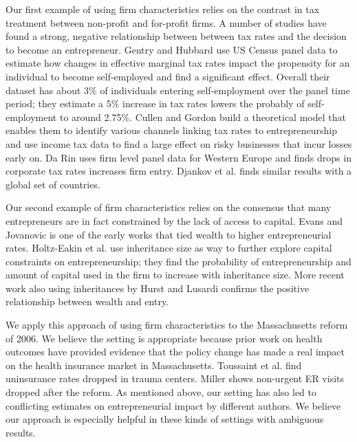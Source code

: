 \documentclass[12pt]{article}
\begin{document}
Our first example of using firm characteristics relies on the contrast in tax treatment between non-profit and for-profit firms. A number of studies have found a strong, negative relationship between between tax rates and the decision to become an entrepreneur. Gentry and Hubbard \citep{gentry2000tax} use US Census panel data to estimate how changes in effective marginal tax rates impact the propensity for an individual to become self-employed and find a significant effect. Overall their dataset has about 3\% of individuals entering self-employment over the panel time period; they estimate a 5\% increase in tax rates lowers the probably of self-employment to around 2.75\%. Cullen and Gordon \citep{cullen2007taxes} build a theoretical model that enables them to identify various channels linking tax rates to entrepreneurship and use income tax data to find a large effect on risky businesses that incur losses early on. Da Rin \citep{da2011entrepreneurship} uses firm level panel data for Western Europe and finds drops in corporate tax rates increases firm entry. Djankov et al. \citep{djankov2010effect} finds similar results with a global set of countries. 

Our second example of firm characteristics relies on the consensus that many entrepreneurs are in fact constrained by the lack of access to capital. Evans and Jovanovic \citep{evans1989estimated} is one of the early works that tied wealth to higher entrepreneurial rates. Holtz-Eakin et al. \citep{holtz1994entrepreneurial} use inheritance size as way to further explore capital constraints on entrepreneurship; they find the probability of entrepreneurship and amount of capital used in the firm to increase with inheritance size. More recent work also using inheritances by Hurst and Lusardi \citep{hurst2004liquidity} confirms the positive relationship between wealth and entry. 

We apply this approach of using firm characteristics to the Massachusetts reform of 2006. We believe the setting is appropriate because prior work on health outcomes have provided evidence that the policy change has made a real impact on the health insurance market in Massachusetts. Toussaint et al. \citep{toussaint2014effect} find uninsurance rates dropped in trauma centers. Miller \citep{miller2012effect} shows non-urgent ER visits dropped after the reform. As mentioned above, our setting has also led to conflicting estimates on entrepreneurial impact by different authors. We believe our approach is especially helpful in these kinds of settings with ambiguous results. 
\end{document}
